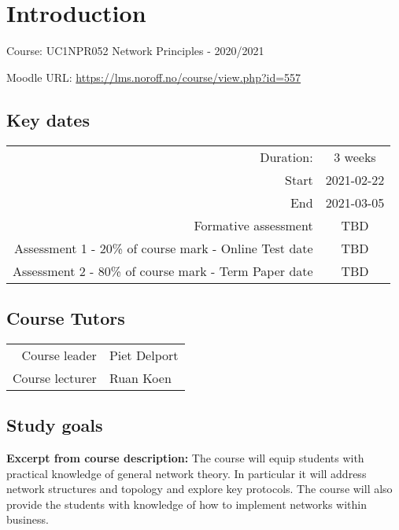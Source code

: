 \section{Introduction}

{\begin{center}

\end{center}


{\huge{Course: UC1NPR052 Network Principles - 2020/2021}}

Moodle URL: \url{https://lms.noroff.no/course/view.php?id=557}

\subsection{Key dates}

\begin{tabular}{r @{: } c }
    Duration: & 3 weeks\\
    Start & 2021-02-22\\
    End & 2021-03-05\\
    Formative assessment & TBD\\
    Assessment 1 - 20\% of course mark - Online Test date & TBD\\
    Assessment 2 - 80\% of course mark - Term Paper date & TBD\\
\end{tabular}

\subsection{Course Tutors}

\begin{tabular}{r @{: } l}
    Course leader & Piet Delport\\
    Course lecturer & Ruan Koen\\
\end{tabular}

\subsection{Study goals}

{\bfseries{Excerpt from course description:}}
The course will equip students with practical knowledge of general network theory. In particular it will address network structures and topology and explore key protocols. The course will also provide the students with knowledge of how to implement networks within business.


}

